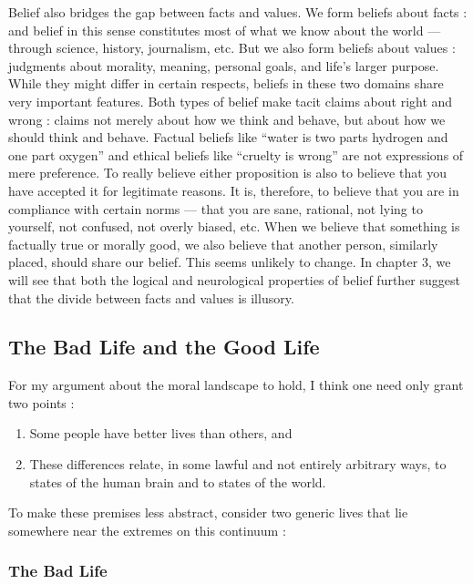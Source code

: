 \documentclass[a4paper,14pt]{extbook}
\begin{document}
Belief also bridges the gap between facts and values.
We form beliefs about facts :
and belief in this sense constitutes most of what we know about the world --- through science, history, journalism, etc.
But we also form beliefs about values :
judgments about morality, meaning, personal goals, and life's larger purpose.
While they might differ in certain respects, beliefs in these two domains share very important features.
Both types of belief make tacit claims about right and wrong :
claims not merely about how we think and behave, but about how we should think and behave.
Factual beliefs like ``water is two parts hydrogen and one part oxygen'' and ethical beliefs like ``cruelty is wrong'' are not expressions of mere preference.
To really believe either proposition is also to believe that you have accepted it for legitimate reasons.
It is, therefore, to believe that you are in compliance with certain norms --- that you are sane, rational, not lying to yourself, not confused, not overly biased, etc.
When we believe that something is factually true or morally good, we also believe that another person, similarly placed, should share our belief.
This seems unlikely to change.
In chapter 3, we will see that both the logical and neurological properties of belief further suggest that the divide between facts and values is illusory.

\subsection{The Bad Life and the Good Life}

For my argument about the moral landscape to hold, I think one need only grant two points :

\begin{enumerate}
      \item Some people have better lives than others, and
      \item These differences relate, in some lawful and not entirely arbitrary ways, to states of the human brain and to states of the world.
\end{enumerate}

To make these premises less abstract, consider two generic lives that lie somewhere near the extremes on this continuum :

\subsubsection{The Bad Life}
\end{document}

